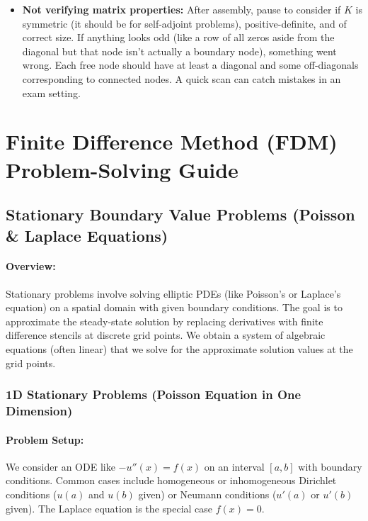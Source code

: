 \documentclass[a4paper,11pt]{article}
\begin{document}
\begin{itemize}
    \item \textbf{Not verifying matrix properties:} After assembly, pause to consider if $K$ is symmetric (it should be for self-adjoint problems), positive-definite, and of correct size. If anything looks odd (like a row of all zeros aside from the diagonal but that node isn't actually a boundary node), something went wrong. Each free node should have at least a diagonal and some off-diagonals corresponding to connected nodes. A quick scan can catch mistakes in an exam setting.
\end{itemize}

\section{Finite Difference Method (FDM) Problem-Solving Guide}

\subsection{Stationary Boundary Value Problems (Poisson \& Laplace Equations)}

\paragraph{Overview:}
Stationary problems involve solving elliptic PDEs (like Poisson’s or Laplace’s equation) on a spatial domain with given boundary conditions. The goal is to approximate the steady-state solution by replacing derivatives with finite difference stencils at discrete grid points. We obtain a system of algebraic equations (often linear) that we solve for the approximate solution values at the grid points.
\subsubsection{1D Stationary Problems (Poisson Equation in One Dimension)}
\paragraph{Problem Setup:}
We consider an ODE like $-u''(x) = f(x)$ on an interval $[a,b]$ with boundary conditions. Common cases include homogeneous or inhomogeneous Dirichlet conditions ($u(a)$ and $u(b)$ given) or Neumann conditions ($u'(a)$ or $u'(b)$ given). The Laplace equation is the special case $f(x)=0$.
\end{document}
